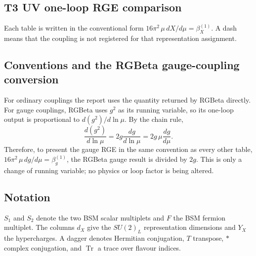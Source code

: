 \documentclass{article}
\begin{document}
\begin{landscape}
\section*{T3 UV one-loop RGE comparison}
Each table is written in the conventional form $16\pi^2\,\mu\,dX/d\mu=\beta_X^{(1)}$. A dash means that the coupling is not registered for that representation assignment.
\medskip
\subsection*{Conventions and the RGBeta gauge-coupling conversion}
For ordinary couplings the report uses the quantity returned by RGBeta directly. For gauge couplings, RGBeta uses $g^2$ as its running variable, so its one-loop output is proportional to $d(g^2)/d\ln\mu$. By the chain rule,
\[\frac{d(g^2)}{d\ln\mu}=2g\frac{dg}{d\ln\mu}=2g\,\mu\frac{dg}{d\mu}.\]
Therefore, to present the gauge RGE in the same convention as every other table, $16\pi^2\,\mu\,dg/d\mu=\beta_g^{(1)}$, the RGBeta gauge result is divided by $2g$. This is only a change of running variable; no physics or loop factor is being altered.
\medskip
\subsection*{Notation}
$S_1$ and $S_2$ denote the two BSM scalar multiplets and $F$ the BSM fermion multiplet. The columns $d_X$ give the $SU(2)_L$ representation dimensions and $Y_X$ the hypercharges. A dagger denotes Hermitian conjugation, $T$ transpose, $*$ complex conjugation, and $\operatorname{Tr}$ a trace over flavour indices.
\medskip

\end{landscape}
\end{document}
